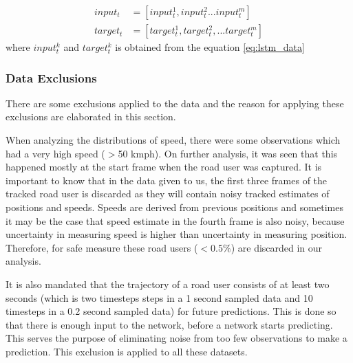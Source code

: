 \documentclass{article}
\begin{document}
\begin{equation}\label{eq:transformers_data}
    \begin{split}
        input_t&=[input^{1}_t,input^{2}_t...input^{m}_t]\\
        target_t&=[target^{1}_t,target^{2}_t,...target^{m}_t]
    \end{split}
\end{equation}
where $input^{k}_t$ and $target^{k}_t$ is obtained from the equation \ref{eq:lstm_data}

\subsubsection{Data Exclusions}\label{ssec:exclusions}
There are some exclusions applied to the data and the reason for applying these exclusions are elaborated in this section. 

When analyzing the distributions of speed, there were some observations which had a very high speed ($>$50 kmph). On further analysis, it was seen that this happened mostly at the start frame when the road user was captured.  It is important to know that in the data given to us, the first three frames of the tracked road user is discarded as they will contain noisy tracked estimates of positions and speeds. Speeds are derived from previous positions and sometimes it may be the case that speed estimate in the fourth frame is also noisy, because uncertainty in measuring speed is higher than uncertainty in measuring position. Therefore,  for safe measure these road users ($<0.5\%$) are discarded in our analysis.

It is also mandated that the trajectory of a road user consists of at least two seconds (which is two timesteps steps in a 1 second sampled data and 10 timesteps in a 0.2 second sampled data) for future predictions. This is done so that there is enough input to the network, before a network starts predicting. This serves the purpose of eliminating noise from too few observations to make a prediction. This exclusion is applied to all these datasets. 
\end{document}
